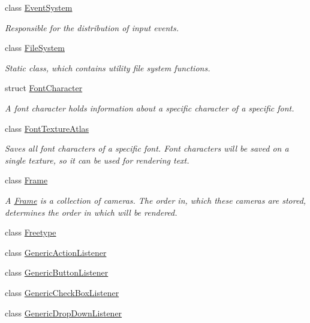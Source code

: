\begin{DoxyCompactItemize}
class \mbox{\hyperlink{classec_1_1_event_system}{Event\+System}}
\begin{DoxyCompactList}\small\item\em Responsible for the distribution of input events. \end{DoxyCompactList}\item 
class \mbox{\hyperlink{classec_1_1_file_system}{File\+System}}
\begin{DoxyCompactList}\small\item\em Static class, which contains utility file system functions. \end{DoxyCompactList}\item 
struct \mbox{\hyperlink{structec_1_1_font_character}{Font\+Character}}
\begin{DoxyCompactList}\small\item\em A font character holds information about a specific character of a specific font. \end{DoxyCompactList}\item 
class \mbox{\hyperlink{classec_1_1_font_texture_atlas}{Font\+Texture\+Atlas}}
\begin{DoxyCompactList}\small\item\em Saves all font characters of a specific font. Font characters will be saved on a single texture, so it can be used for rendering text. \end{DoxyCompactList}\item 
class \mbox{\hyperlink{classec_1_1_frame}{Frame}}
\begin{DoxyCompactList}\small\item\em A \mbox{\hyperlink{classec_1_1_frame}{Frame}} is a collection of cameras. The order in, which these cameras are stored, determines the order in which will be rendered. \end{DoxyCompactList}\item 
class \mbox{\hyperlink{classec_1_1_freetype}{Freetype}}
\item 
class \mbox{\hyperlink{classec_1_1_generic_action_listener}{Generic\+Action\+Listener}}
\item 
class \mbox{\hyperlink{classec_1_1_generic_button_listener}{Generic\+Button\+Listener}}
\item 
class \mbox{\hyperlink{classec_1_1_generic_check_box_listener}{Generic\+Check\+Box\+Listener}}
\item 
class \mbox{\hyperlink{classec_1_1_generic_drop_down_listener}{Generic\+Drop\+Down\+Listener}}
\item 

\end{DoxyCompactItemize}
